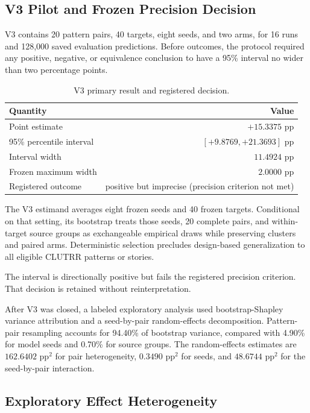 \subsection{V3 Pilot and Frozen Precision Decision}

V3 contains 20 pattern pairs, 40 targets, eight seeds, and two arms, for 16
runs and 128,000 saved evaluation predictions.  Before outcomes, the protocol
required any positive, negative, or equivalence conclusion to have a 95\%
interval no wider than two percentage points.

\begin{table}[H]
\caption{V3 primary result and registered decision.}
\label{tab:app-clutrr-v3}
\centering
\small
\begin{tabular}{lr}
\toprule
Quantity & Value \\
\midrule
Point estimate & $+15.3375$ pp \\
95\% percentile interval & $[+9.8769,+21.3693]$ pp \\
Interval width & $11.4924$ pp \\
Frozen maximum width & $2.0000$ pp \\
Registered outcome & positive but imprecise (precision criterion not met) \\
\bottomrule
\end{tabular}
\end{table}

The V3 estimand averages eight frozen seeds and 40 frozen targets.  Conditional
on that setting, its bootstrap treats those seeds, 20 complete pairs, and
within-target source groups as exchangeable empirical draws while preserving
clusters and paired arms.  Deterministic selection precludes design-based
generalization to all eligible CLUTRR patterns or stories.

The interval is directionally positive but fails the registered precision
criterion.  That decision is retained without reinterpretation.

After V3 was closed, a labeled exploratory analysis used bootstrap-Shapley
variance attribution and a seed-by-pair random-effects decomposition.
Pattern-pair resampling accounts for 94.40\% of bootstrap variance, compared
with 4.90\% for model seeds and 0.70\% for source groups.  The random-effects
estimates are $162.6402$ pp$^2$ for pair heterogeneity, $0.3490$ pp$^2$ for
seeds, and $48.6744$ pp$^2$ for the seed-by-pair interaction.

\subsection{Exploratory Effect Heterogeneity}
\label{tmlrs:app:clutrr-heterogeneity}

